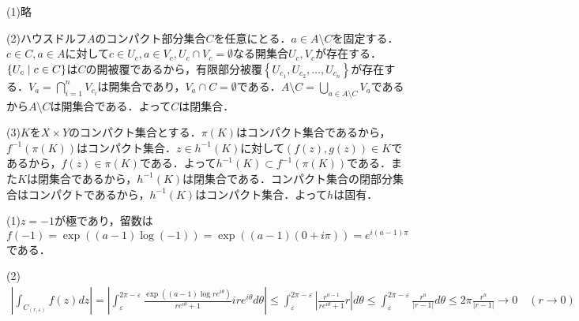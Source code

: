 \documentclass[
		book,
		head_space=20mm,
		foot_space=20mm,
		gutter=10mm,
		line_length=190mm
]{jlreq}
\begin{document}
(1)略

(2)ハウスドルフ$A$のコンパクト部分集合$C$を任意にとる．$a \in A\setminus C$を固定する．$c \in C,a\in A$に対して$c \in U_c,a \in V_c , U_c \cap V_c=\emptyset$なる開集合$U_c,V_c$が存在する．$\left\{ U_c\mathrel{}\middle|\mathrel{} c \in C\right\}$は$C$の開被覆であるから，有限部分被覆$\left\{ U_{c_1},U_{c_2},\dots,U_{c_n}\right\}$が存在する．$V_a= \bigcap\limits_{i=1}^n V_{c_i}$は開集合であり，$V_a \cap C=\emptyset$である．$A\setminus C=\bigcup\limits_{a\in A\setminus C} V_a$であるから$A\setminus C$は開集合である．よって$C$は閉集合．

(3)$K$を$X\times Y$のコンパクト集合とする．$\pi(K)$はコンパクト集合であるから，$f^{-1}(\pi(K))$はコンパクト集合．$z \in h^{-1}(K)$に対して$(f(z),g(z))\in K$であるから，$f(z)\in \pi(K)$である．よって$h^{-1}(K)\subset f^{-1}(\pi(K))$である．また$K$は閉集合であるから，$h^{-1}(K)$は閉集合である．コンパクト集合の閉部分集合はコンパクトであるから，$h^{-1}(K)$はコンパクト集合．よって$h$は固有．

(1)$z=-1$が極であり，留数は$f(-1)= \exp((a-1)\log(-1))=\exp((a-1)(0+i\pi))=e^{i(a-1)\pi}$である．

(2)
\begin{align}
    \left| \int_{C_{(r,\varepsilon)}} f(z)dz\right|=\left| \int_\varepsilon^{2\pi-\varepsilon} \frac{\exp((a-1)\log re^{i\theta})}{re^{i\theta}+1}ire^{i\theta}d\theta\right|\le \int_\varepsilon^{2\pi-\varepsilon} \left| \frac{r^{a-1}}{re^{i\theta}+1}r\right|d\theta\le \int_{\varepsilon}^{2\pi-\varepsilon} \frac{r^a}{|r-1|}d\theta \le 2\pi \frac{r^a}{|r-1|}\rightarrow 0 \quad (r\rightarrow 0)
\end{align}
\end{document}
